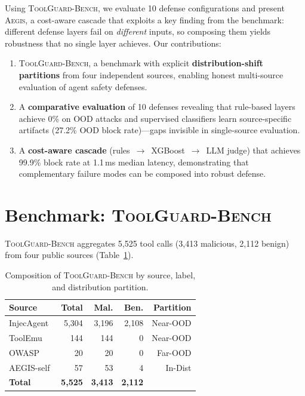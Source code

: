 \documentclass[sigconf]{acmart}
\newcommand{\system}{\textsc{Aegis}\xspace}
\newcommand{\bench}{\textsc{ToolGuard-Bench}\xspace}
\begin{document}
Using \bench, we evaluate 10 defense configurations and present \system, a cost-aware cascade that exploits a key finding from the benchmark: different defense layers fail on \emph{different} inputs, so composing them yields robustness that no single layer achieves.
Our contributions:
\begin{enumerate}[nolistsep,leftmargin=*]
\item \bench, a benchmark with explicit \textbf{distribution-shift partitions} from four independent sources, enabling honest multi-source evaluation of agent safety defenses.
\item A \textbf{comparative evaluation} of 10 defenses revealing that rule-based layers achieve 0\% on OOD attacks and supervised classifiers learn source-specific artifacts (27.2\% OOD block rate)---gaps invisible in single-source evaluation.
\item A \textbf{cost-aware cascade} (rules~$\to$~XGBoost~$\to$~LLM judge) that achieves 99.9\% block rate at 1.1\,ms median latency, demonstrating that complementary failure modes can be composed into robust defense.
\end{enumerate}

\section{Benchmark: \bench}
\label{sec:bench}

\bench aggregates 5{,}525 tool calls (3{,}413 malicious, 2{,}112 benign) from four public sources (Table~\ref{tab:benchcomp}).

\begin{table}[t]
\centering\small
\caption{Composition of \bench by source, label, and distribution partition.}
\vspace{-0.1in}
\label{tab:benchcomp}
\begin{tabular}{lrrrr}
\toprule
Source & Total & Mal. & Ben. & Partition \\
\midrule
InjecAgent~\cite{zhan2024injecagent} & 5{,}304 & 3{,}196 & 2{,}108 & Near-OOD \\
ToolEmu~\cite{ruan2024toolemu} & 144 & 144 & 0 & Near-OOD \\
OWASP~\cite{owasp2025} & 20 & 20 & 0 & Far-OOD \\
AEGIS-self & 57 & 53 & 4 & In-Dist \\
\midrule
\textbf{Total} & \textbf{5{,}525} & \textbf{3{,}413} & \textbf{2{,}112} & \\
\bottomrule
\end{tabular}
\vspace{-0.1in}
\end{table}
\end{document}
